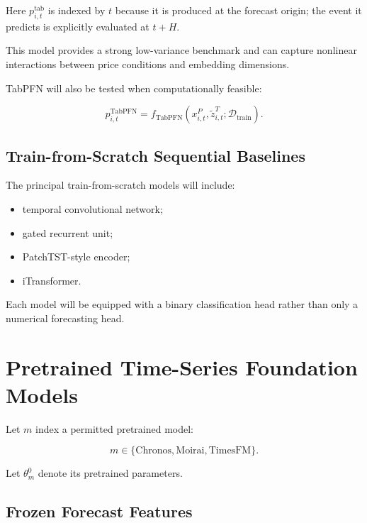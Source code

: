 \documentclass[11pt]{article}
\begin{document}
Here $p^{\mathrm{tab}}_{i,t}$ is indexed by $t$ because it is produced at the
forecast origin; the event it predicts is explicitly evaluated at $t+H$.

This model provides a strong low-variance benchmark and can capture nonlinear
interactions between price conditions and embedding dimensions.

TabPFN will also be tested when computationally feasible:

\begin{equation}
p^{\mathrm{TabPFN}}_{i,t}
=
f_{\mathrm{TabPFN}}
\left(
x^P_{i,t},
\widetilde z^T_{i,t};
\mathcal{D}_{\mathrm{train}}
\right).
\end{equation}

\subsection{Train-from-Scratch Sequential Baselines}

The principal train-from-scratch models will include:

\begin{itemize}
    \item temporal convolutional network;
    \item gated recurrent unit;
    \item PatchTST-style encoder;
    \item iTransformer.
\end{itemize}

Each model will be equipped with a binary classification head rather than only
a numerical forecasting head.

\section{Pretrained Time-Series Foundation Models}

Let $m$ index a permitted pretrained model:

\begin{equation}
m
\in
\{
\mathrm{Chronos},
\mathrm{Moirai},
\mathrm{TimesFM}
\}.
\end{equation}

Let $\theta_m^0$ denote its pretrained parameters.

\subsection{Frozen Forecast Features}
\end{document}
